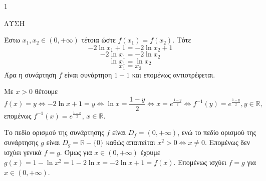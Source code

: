 \begin{ylh}{1}
    \item [Ύλη από εικόνα]
\end{ylh}
ΛΥΣΗ
\begin{alist}
    \item [α)] Έστω $x_1, x_2 \in (0, +\infty)$ τέτοια ώστε $f(x_1) = f(x_2)$. Τότε
    \[
    -2\ln x_1 + 1 = -2\ln x_2 + 1
    \]
    \[
    -2\ln x_1 = -2\ln x_2
    \]
    \[
    \ln x_1 = \ln x_2
    \]
    \[
    x_1 = x_2
    \]
    Άρα η συνάρτηση $f$ είναι συνάρτηση $1-1$ και επομένως αντιστρέφεται.

    \item [β)] Με $x > 0$ θέτουμε
    \[
    f(x) = y \Leftrightarrow -2\ln x + 1 = y \Leftrightarrow \ln x = \frac{1-y}{2} \Leftrightarrow x = e^{\frac{1-y}{2}} \Leftrightarrow f^{-1}(y) = e^{\frac{1-y}{2}}, y \in \mathbb{R},
    \]
    επομένως $f^{-1}(x) = e^{\frac{1-x}{2}}$, $x \in \mathbb{R}$.

    \item [γ)] Το πεδίο ορισμού της συνάρτησης $f$ είναι $D_f = (0, +\infty)$, ενώ το πεδίο ορισμού της συνάρτησης $g$ είναι $D_g = \mathbb{R}-\{0\}$ καθώς απαιτείται $x^2 > 0 \Leftrightarrow x \neq 0$. Επομένως δεν ισχύει γενικά $f = g$. Όμως για $x \in (0, +\infty)$ έχουμε $g(x) = 1 - \ln x^2 = 1 - 2\ln x = -2\ln x + 1 = f(x)$.
    Επομένως ισχύει $f = g$ για $x \in (0, +\infty)$.
\end{alist}